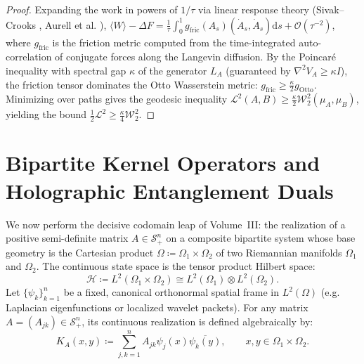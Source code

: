 \documentclass[11pt,a4paper,reqno]{amsart}
\theoremstyle{definition}
\theoremstyle{remark}
\numberwithin{equation}{section}
\newcommand{\dif}{\mathrm{d}}
\begin{document}
\begin{proof}
Expanding the work in powers of $1/\tau$ via linear response theory (Sivak--Crooks \cite{SivakCrooks2012}, Aurell et al. \cite{Aurell2012}), $\langle W \rangle - \Delta F = \frac{1}{\tau} \int_0^1 g_{\mathrm{fric}}(A_s)(\dot{A}_s, \dot{A}_s) \dif s + \mathcal{O}(\tau^{-2})$, where $g_{\mathrm{fric}}$ is the friction metric computed from the time-integrated auto-correlation of conjugate forces along the Langevin diffusion. By the Poincaré inequality with spectral gap $\kappa$ of the generator $L_A$ (guaranteed by $\nabla^2 V_A \ge \kappa I$), the friction tensor dominates the Otto Wasserstein metric: $g_{\mathrm{fric}} \ge \frac{\kappa}{2} g_{\mathrm{Otto}}$. Minimizing over paths gives the geodesic inequality $\mathcal{L}^2(A, B) \ge \frac{\kappa}{2} \mathcal{W}_2^2(\mu_A, \mu_B)$, yielding the bound $\frac{1}{2}\mathcal{L}^2 \ge \frac{\kappa}{4}\mathcal{W}_2^2$.
\end{proof}

\section{Bipartite Kernel Operators and Holographic Entanglement Duals}
\label{sec:bipartite}

We now perform the decisive codomain leap of Volume~III: the realization of a positive semi-definite matrix $A \in \mathcal{S}_+^n$ on a composite bipartite system whose base geometry is the Cartesian product $\Omega \coloneqq \Omega_1 \times \Omega_2$ of two Riemannian manifolds $\Omega_1$ and $\Omega_2$. The continuous state space is the tensor product Hilbert space:
\begin{equation}
\mathcal{H} \coloneqq L^2(\Omega_1 \times \Omega_2) \cong L^2(\Omega_1) \otimes L^2(\Omega_2).
\end{equation}
Let $\{\psi_k\}_{k=1}^n$ be a fixed, canonical orthonormal spatial frame in $L^2(\Omega)$ (e.g. Laplacian eigenfunctions or localized wavelet packets). For any matrix $A = (A_{jk}) \in \mathcal{S}_+^n$, its continuous realization is defined algebraically by:
\begin{equation}
\label{eq:kernel_alg_def}
K_A(x, y) \coloneqq \sum_{j, k=1}^n A_{jk} \psi_j(x) \overline{\psi_k(y)}, \qquad x, y \in \Omega_1 \times \Omega_2.
\end{equation}
\end{document}
